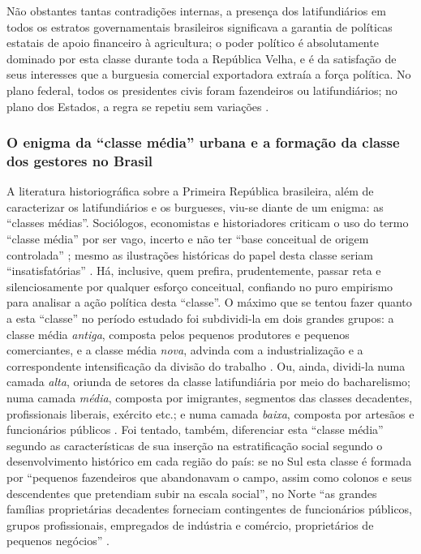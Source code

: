 Não obstantes tantas contradições internas, a presença dos latifundiários em todos os estratos governamentais brasileiros significava a garantia de políticas estatais de apoio financeiro à agricultura; o poder político é absolutamente dominado por esta classe durante toda a República Velha, e é da satisfação de seus interesses que a burguesia comercial exportadora extraía a força política. No plano federal, todos os presidentes civis foram fazendeiros ou latifundiários; no plano dos Estados, a regra se repetiu sem variações \cite[p.~155]{CARONE1970inst}.

\subsubsection{O enigma da ``classe média'' urbana e a formação da classe dos gestores no Brasil}\label{subsubsec:clamed}

A literatura historiográfica sobre a Primeira República brasileira, além de caracterizar os latifundiários e os burgueses, viu-se diante de um enigma: as ``classes médias''. Sociólogos, economistas e historiadores criticam o uso do termo ``classe média'' por ser vago, incerto e não ter ``base conceitual de origem controlada'' \cite[p.~19]{POCHMANN2014};  mesmo as ilustrações históricas do papel desta classe seriam ``insatisfatórias'' \cite[p.~9]{pinheiro_clamed_1977}. Há, inclusive, quem prefira, prudentemente, passar reta e silenciosamente por qualquer esforço conceitual, confiando no puro empirismo para analisar a ação política desta ``classe''. O máximo que se tentou fazer quanto a esta ``classe'' no período estudado foi subdividi-la em dois grandes grupos: a classe média \textit{antiga}, composta pelos pequenos produtores e pequenos comerciantes, e a classe média \textit{nova}, advinda com a industrialização e a correspondente intensificação da divisão do trabalho \cite[p.~11]{pinheiro_clamed_1977}. Ou, ainda, dividi-la numa camada \textit{alta}, oriunda de setores da classe latifundiária por meio do bacharelismo; numa camada \textit{média}, composta por imigrantes, segmentos das classes decadentes, profissionais liberais, exército etc.; e numa camada \textit{baixa}, composta por artesãos e funcionários públicos \cite[p. ~175-176]{CARONE1970inst}. Foi tentado, também, diferenciar esta ``classe média'' segundo as características de sua inserção na estratificação social segundo o desenvolvimento histórico em cada região do país: se no Sul esta classe é formada por ``pequenos fazendeiros que abandonavam o campo, assim como colonos e seus descendentes que pretendiam subir na escala social'', no Norte ``as grandes famílias proprietárias decadentes forneciam contingentes de funcionários públicos, grupos profissionais, empregados de indústria e comércio, proprietários de pequenos negócios''  \cite[p.~16]{pinheiro_clamed_1977}.

